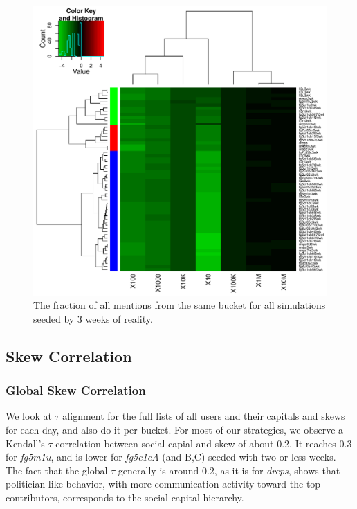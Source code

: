 \documentclass[10pt,oneside]{memoir}
\begin{document}
\begin{Spacing}{2}
\begin{figure}
\begin{center}
    \includegraphics{figures/crop/heatmap-b2bm-self-rel-medians-log10-3wk}
    \caption{The fraction of all mentions from the same bucket for all simulations seeded by 3 weeks of reality.}
    \label{figure:heatmap-b2bm-self-rel-medians-3wk}
\end{center}
\end{figure}
\pagebreak \subsection{Skew Correlation}
\label{skewcorrelation}

\subsubsection{Global Skew Correlation}
\label{globalskewcorrelation}

We look at $\tau$ alignment for the full lists of all users and their capitals and skews for each day, and also do it per bucket. 
For most of our strategies, we observe a Kendall's $\tau$ correlation between social capial and skew of about 0.2.  It reaches 0.3 for {\itshape fg5m1u}, and is lower for {\itshape fg5c1cA} (and B,C) seeded with two or less weeks.
The fact that the global $\tau$ generally is around 0.2, as it is for {\itshape dreps}, shows that politician-like behavior, with more communication activity toward the top contributors, corresponds to the social capital hierarchy.



\end{Spacing}
\end{document}
